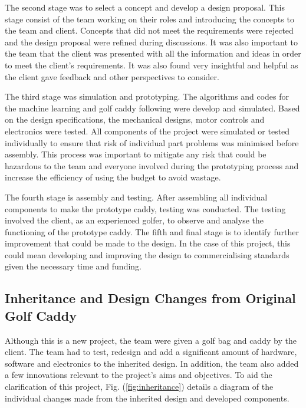 \documentclass[11pt,landscape]{article}
\begin{document}
\begin{multicols}{2}
The second stage was to select a concept and develop a design proposal. This
stage consist of the team working on their roles and introducing the concepts to the
team and client. Concepts that did not meet the requirements were rejected and
the design proposal were refined during discussions. It was also important to
the team that the client was presented with all the information and ideas in
order to meet the client’s requirements. It was also found very insightful and
helpful as the client gave feedback and other perspectives to consider. 

The third stage was simulation and prototyping. The algorithms and codes for the
machine learning and golf caddy following were develop and simulated. Based on
the design specifications, the mechanical designs, motor controls and
electronics were tested. All components of the project were simulated or tested
individually to ensure that risk of individual part problems was minimised
before assembly. This process was important to mitigate any risk that could be
hazardous to the team and everyone involved during the prototyping process and
increase the efficiency of using the budget to avoid wastage. 

The fourth stage is assembly and testing. After assembling all individual
components to make the prototype caddy, testing was conducted. The testing
involved the client, as an experienced golfer, to observe and analyse the
functioning of the prototype caddy. The fifth and
final stage is to identify further improvement that could be made to the design.
In the case of this project, this could mean developing and improving the design
to commercialising standards given the necessary time and funding. 

\subsection{Inheritance and Design Changes from Original Golf Caddy}
Although this is a new project, the team were given a golf bag and caddy by the
client. The team had to test, redesign and add a significant amount of hardware,
software and electronics to the inherited design. In addition, the team also
added a few innovations relevant to the project’s aims and objectives. To aid
the clarification of this project, Fig. (\ref{fig:inheritance}) details a diagram of the
individual changes made from the inherited design and developed components. 
\end{multicols}
\newpage
\end{document}
